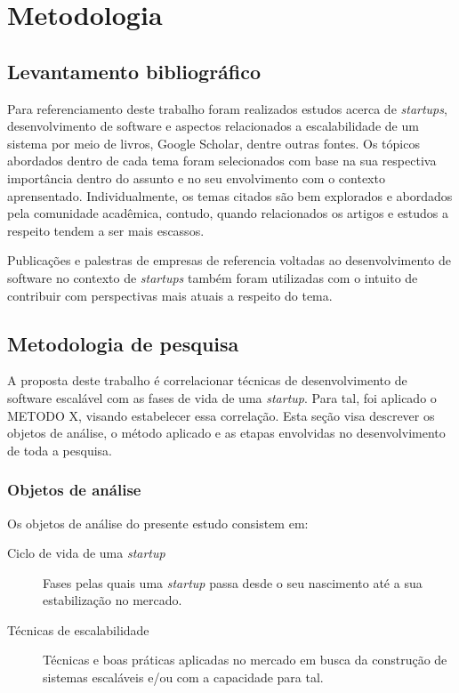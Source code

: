 \chapter{Metodologia}
\label{sec:Metodologia}

\section{Levantamento bibliográfico}

Para referenciamento deste trabalho foram realizados estudos acerca de
\textit{startups}, desenvolvimento de software e aspectos relacionados
a escalabilidade de um sistema por meio de livros, Google Scholar, dentre
outras fontes. Os tópicos abordados dentro de cada tema foram selecionados
com base na sua respectiva importância dentro do assunto e no seu envolvimento
com o contexto aprensentado. Individualmente, os temas citados são bem explorados e
abordados pela comunidade acadêmica, contudo, quando relacionados os artigos e
estudos a respeito tendem a ser mais escassos.

Publicações e palestras de empresas de referencia voltadas ao desenvolvimento de
software no contexto de \textit{startups} também foram utilizadas com o intuito de
contribuir com perspectivas mais atuais a respeito do tema.

\section{Metodologia de pesquisa}
\label{sec:MetodologiaPesquisa}

A proposta deste trabalho é correlacionar técnicas de desenvolvimento de software escalável com as
fases de vida de uma \textit{startup}. Para tal, foi aplicado o METODO X, visando estabelecer essa
correlação. Esta seção visa descrever os objetos de análise, o método aplicado e
as etapas envolvidas no desenvolvimento de toda a pesquisa. 

\subsection{Objetos de análise}
\label{sec:ObjetosDeAnalise}


Os objetos de análise do presente estudo consistem em:

    \begin{description}
        \item [Ciclo de vida de uma \textit{startup}] Fases pelas quais uma \textit{startup} passa
            desde o seu nascimento até a sua estabilização no mercado.
        \item [Técnicas de escalabilidade] Técnicas e boas práticas aplicadas no mercado em busca da
            construção de sistemas escaláveis e/ou com a capacidade para tal.
    \end{description}

